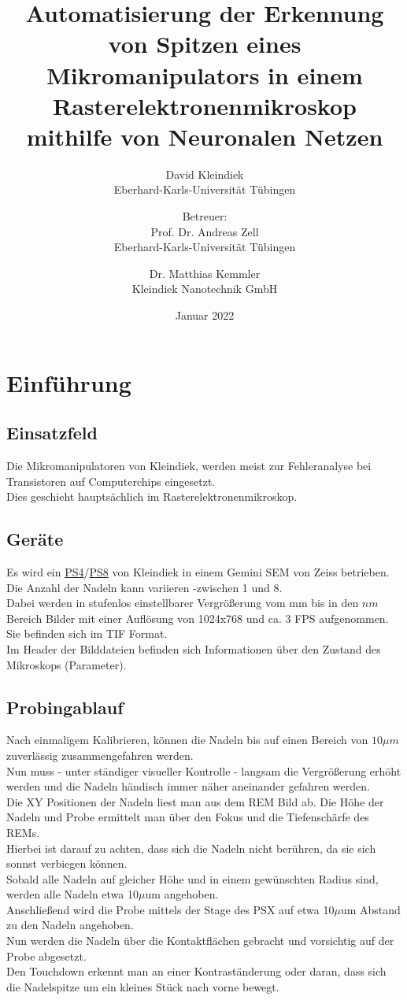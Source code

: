 \documentclass{article}
\title{Automatisierung der Erkennung von Spitzen eines Mikromanipulators in einem Rasterelektronenmikroskop mithilfe von Neuronalen Netzen}
\author{David Kleindiek\\ Eberhard-Karls-Universität Tübingen
\and Betreuer: \\ Prof. Dr. Andreas Zell \\ Eberhard-Karls-Universität Tübingen
\and Dr. Matthias Kemmler\\ Kleindiek Nanotechnik GmbH}
\date{Januar 2022}
\begin{document}
	
	\maketitle
	
	\section{Einführung}
	\subsection{Einsatzfeld}
	Die Mikromanipulatoren von Kleindiek, werden meist zur Fehleranalyse bei Transistoren auf Computerchips eingesetzt.\\
	Dies geschieht hauptsächlich im Rasterelektronenmikroskop.
	\subsection{Geräte}
	Es wird ein \href{https://www.kleindiek.com/ps4.html}{PS4}/\href{https://www.kleindiek.com/ps8.html}{PS8} von Kleindiek in einem Gemini SEM von Zeiss betrieben.\\
	Die Anzahl der Nadeln kann variieren -zwischen 1 und 8.\\
	Dabei werden in stufenlos einstellbarer Vergrößerung vom mm bis in den $nm$ Bereich Bilder mit einer Auflösung von 1024x768 und ca. 3 FPS aufgenommen.\\
	Sie befinden sich im TIF Format.\\
	Im Header der Bilddateien befinden sich Informationen über den Zustand des Mikroskops (Parameter).
	\subsection{Probingablauf}
	Nach einmaligem Kalibrieren, können die Nadeln bis auf einen Bereich von $10\mu m$ zuverlässig zusammengefahren werden.\\
	Nun muss - unter ständiger visueller Kontrolle - langsam die Vergrößerung erhöht werden und die Nadeln händisch immer näher aneinander gefahren werden.\\
	Die XY Positionen der Nadeln liest man aus dem REM Bild ab. Die Höhe der Nadeln und Probe ermittelt man über den Fokus und die Tiefenschärfe des REMs.\\
	Hierbei ist darauf zu achten, dass sich die Nadeln nicht berühren, da sie sich sonnst verbiegen können.\\
	Sobald alle Nadeln auf gleicher Höhe und in einem gewünschten Radius sind, werden alle Nadeln etwa 10$\mu$um angehoben.\\
	Anschließend wird die Probe mittels der Stage des PSX auf etwa 10$\mu$um Abstand zu den Nadeln angehoben.\\
	Nun werden die Nadeln über die Kontaktflächen gebracht und vorsichtig auf der Probe abgesetzt.\\
	Den Touchdown erkennt man an einer Kontraständerung oder daran, dass sich die Nadelspitze um ein kleines Stück nach vorne bewegt.
	
\end{document}
